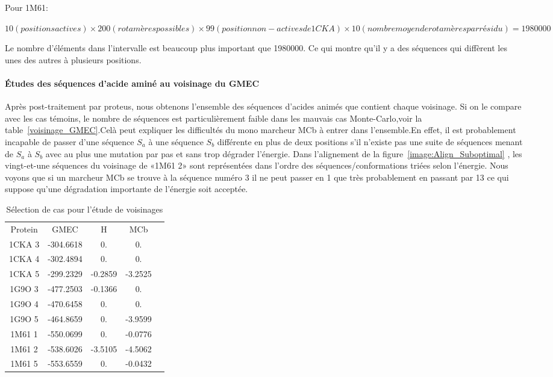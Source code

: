Pour 1M61:

$10 (positions actives) \times 200 (rotamères possibles) \times 99 (position non-actives de 1CKA) \times 10 (nombre moyen de rotamères par résidu)=1980000 $

Le nombre d'éléments dans l'intervalle est beaucoup plus important que 1980000. Ce qui montre qu'il y a des séquences qui diffèrent les unes des autres à plusieurs positions.
\paragraph{Études des séquences d'acide aminé au voisinage du GMEC}
\label{para:vois_MCb}
Après post-traitement par proteus, nous obtenons l'ensemble des séquences d'acides animés que contient chaque voisinage. Si on le compare avec les cas témoins, le nombre de séquences est particulièrement faible dans les mauvais cas Monte-Carlo,voir la table~\ref{voisinage_GMEC}.Celà peut expliquer les difficultés du mono marcheur MCb à entrer dans l'ensemble.En effet, il est probablement incapable de passer d'une séquence $S_a$ à une séquence $S_b$ différente en plus de deux positions s'il n'existe pas une suite de séquences menant de $S_a$ à $S_b$ avec au plus une mutation par pas et sans trop dégrader l'énergie. Dans l'alignement de la figure~\ref{image:Align_Suboptimal} , les vingt-et-une séquences du voisinage de «1M61 2» sont représentées dans l'ordre des séquences/conformations triées selon l'énergie. Nous voyons que si un marcheur MCb se trouve à la séquence numéro 3 il ne peut passer en 1 que très probablement en passant par 13 ce qui suppose qu'une dégradation importante de l'énergie soit acceptée.   

    \begin{table}[h]
      \centering

      \begin{tabular}{ccccc}


        \toprule
        Protein & GMEC & H & MCb \\
        \cmidrule{1-5}
        1CKA 3 & -304.6618 & 0. & 0. \\
        1CKA 4 & -302.4894 & 0. & 0. \\
        1CKA 5 & -299.2329 & -0.2859 & -3.2525 \\
        1G9O 3 & -477.2503 & -0.1366 & 0. \\
        1G9O 4 & -470.6458 & 0. & 0. \\
        1G9O 5 & -464.8659 & 0. & -3.9599 \\
        1M61 1 & -550.0699 & 0. & -0.0776 \\
        1M61 2 & -538.6026 & -3.5105 & -4.5062 \\
        1M61 5 & -553.6559 & 0. & -0.0432 \\
        \bottomrule       
      \end{tabular}      
 \caption{Sélection de cas pour l'étude de voisinages}
\label{tab:voisinage_GMEC}      
    \end{table}




